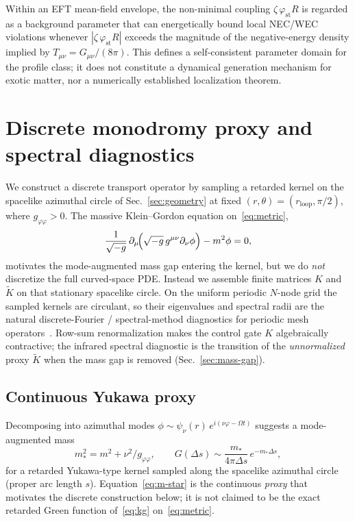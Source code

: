 \documentclass{iopjournal}
\newcommand{\Gmn}{G_{\mu\nu}}
\newcommand{\Tmn}{T_{\mu\nu}}
\newcommand{\phif}{\varphi_{\mathrm{st}}}
\theoremstyle{remark}
\begin{document}

Within an EFT mean-field envelope, the non-minimal coupling $\zeta\,\phif R$ is regarded as a background parameter that can energetically bound local NEC/WEC violations whenever $|\zeta\,\phif R|$ exceeds the magnitude of the negative-energy density implied by $\Tmn=\Gmn/(8\pi)$.
This defines a self-consistent parameter domain for the profile class; it does not constitute a dynamical generation mechanism for exotic matter, nor a numerically established localization theorem.

\section{Discrete monodromy proxy and spectral diagnostics}
\label{sec:monodromy}

We construct a discrete transport operator by sampling a retarded kernel on the spacelike azimuthal circle of Sec.~\ref{sec:geometry} at fixed $(r,\theta)=(r_{\mathrm{loop}},\pi/2)$, where $g_{\varphi\varphi}>0$.
The massive Klein--Gordon equation on~\eqref{eq:metric},
\begin{equation}
\label{eq:kg}
\frac{1}{\sqrt{-g}}\,\partial_{\mu}\!\Bigl(\sqrt{-g}\,g^{\mu\nu}\partial_{\nu}\phi\Bigr)-m^{2}\phi=0,
\end{equation}
motivates the mode-augmented mass gap entering the kernel, but we do \emph{not} discretize the full curved-space PDE.
Instead we assemble finite matrices $K$ and $\widetilde{K}$ on that stationary spacelike circle.
On the uniform periodic $N$-node grid the sampled kernels are circulant, so their eigenvalues and spectral radii are the natural discrete-Fourier / spectral-method diagnostics for periodic mesh operators~\cite{Trefethen2000}.
Row-sum renormalization makes the control gate $K$ algebraically contractive; the infrared spectral diagnostic is the transition of the \emph{unnormalized} proxy $\widetilde{K}$ when the mass gap is removed (Sec.~\ref{sec:mass-gap}).

\subsection{Continuous Yukawa proxy}

Decomposing into azimuthal modes $\phi\sim\psi_{\nu}(r)\,e^{i(\nu\varphi-\Omega t)}$ suggests a mode-augmented mass
\begin{equation}
\label{eq:m-star}
m_{\ast}^{2}=m^{2}+\nu^{2}/g_{\varphi\varphi},
\qquad
G(\Delta s)\sim\frac{m_{\ast}}{4\pi\Delta s}\,e^{-m_{\ast}\Delta s},
\end{equation}
for a retarded Yukawa-type kernel sampled along the spacelike azimuthal circle (proper arc length $s$).
Equation~\eqref{eq:m-star} is the continuous \emph{proxy} that motivates the discrete construction below; it is not claimed to be the exact retarded Green function of~\eqref{eq:kg} on~\eqref{eq:metric}.
\end{document}
